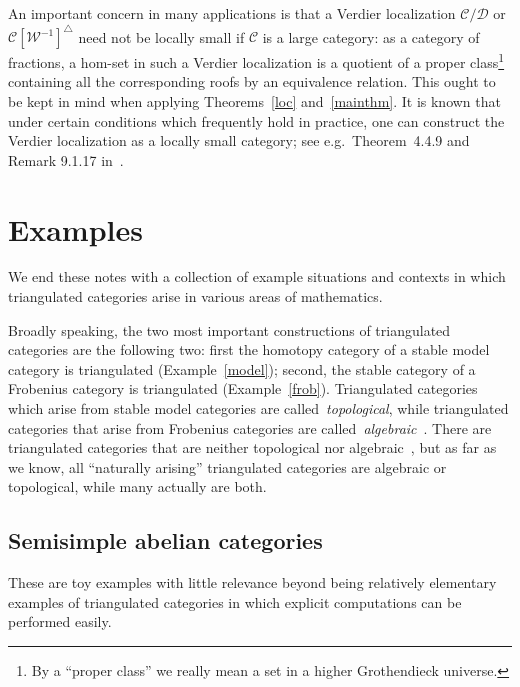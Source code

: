 \documentclass{amsproc}
\theoremstyle{definition}
\begin{document}
An important concern in many applications is that a Verdier localization ${\mathcal{C}}/{\mathcal{D}}$ or ${\mathcal{C}}[{\mathcal{W}}^{-1}]^\triangle$ need not be locally small if ${\mathcal{C}}$ is a large category: as a category of fractions, a hom-set in such a Verdier localization is a quotient of a proper class\footnote{By a ``proper class'' we really mean a set in a higher Grothendieck universe.} containing all the corresponding roofs by an equivalence relation. This ought to be kept in mind when applying Theorems~\ref{loc} and~\ref{mainthm}. It is known that under certain conditions which frequently hold in practice, one can construct the Verdier localization as a locally small category; see e.g.~Theorem~4.4.9 and Remark 9.1.17 in~\cite{Nee}.

\section{Examples}
\label{se:ex}

We end these notes with a collection of example situations and contexts in which triangulated categories arise in various areas of mathematics.

Broadly speaking, the two most important constructions of triangulated categories are the following two: first the homotopy category of a stable model category is triangulated (Example~\ref{model}); second, the stable category of a Frobenius category is triangulated (Example~\ref{frob}). Triangulated categories which arise from stable model categories are called~\emph{topological}, while triangulated categories that arise from Frobenius categories are called~\emph{algebraic}~\cite{Schwede,Schwede2}. There are triangulated categories that are neither topological nor algebraic~\cite{MSS}, but as far as we know, all ``naturally arising'' triangulated categories are algebraic or topological, while many actually are both. 

\subsection{Semisimple abelian categories}
\label{semisimpleab}
These are toy examples with little relevance beyond being relatively elementary examples of triangulated categories in which explicit computations can be performed easily.
\end{document}
